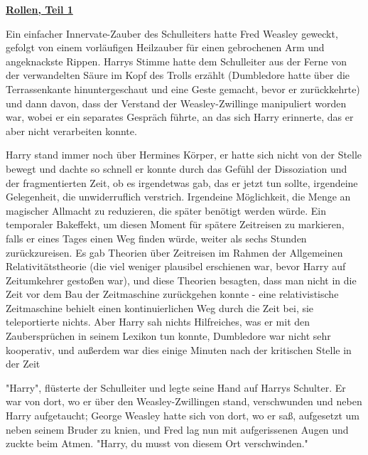 

\hypertarget{rollen-teil-1}{%

\textbf{\uline{Rollen, Teil 1}}

Ein einfacher Innervate-Zauber des Schulleiters hatte Fred Weasley geweckt, gefolgt von einem vorläufigen Heilzauber für einen gebrochenen Arm und angeknackste Rippen. Harrys Stimme hatte dem Schulleiter aus der Ferne von der verwandelten Säure im Kopf des Trolls erzählt (Dumbledore hatte über die Terrassenkante hinuntergeschaut und eine Geste gemacht, bevor er zurückkehrte) und dann davon, dass der Verstand der Weasley-Zwillinge manipuliert worden war, wobei er ein separates Gespräch führte, an das sich Harry erinnerte, das er aber nicht verarbeiten konnte.

Harry stand immer noch über Hermines Körper, er hatte sich nicht von der Stelle bewegt und dachte so schnell er konnte durch das Gefühl der Dissoziation und der fragmentierten Zeit, ob es irgendetwas gab, das er jetzt tun sollte, irgendeine Gelegenheit, die unwiderruflich verstrich. Irgendeine Möglichkeit, die Menge an magischer Allmacht zu reduzieren, die später benötigt werden würde. Ein temporaler Bakeffekt, um diesen Moment für spätere Zeitreisen zu markieren, falls er eines Tages einen Weg finden würde, weiter als sechs Stunden zurückzureisen. Es gab Theorien über Zeitreisen im Rahmen der Allgemeinen Relativitätstheorie (die viel weniger plausibel erschienen war, bevor Harry auf Zeitumkehrer gestoßen war), und diese Theorien besagten, dass man nicht in die Zeit vor dem Bau der Zeitmaschine zurückgehen konnte - eine relativistische Zeitmaschine behielt einen kontinuierlichen Weg durch die Zeit bei, sie teleportierte nichts. Aber Harry sah nichts Hilfreiches, was er mit den Zaubersprüchen in seinem Lexikon tun konnte, Dumbledore war nicht sehr kooperativ, und außerdem war dies einige Minuten nach der kritischen Stelle in der Zeit

"Harry", flüsterte der Schulleiter und legte seine Hand auf Harrys Schulter. Er war von dort, wo er über den Weasley-Zwillingen stand, verschwunden und neben Harry aufgetaucht; George Weasley hatte sich von dort, wo er saß, aufgesetzt um neben seinem Bruder zu knien, und Fred lag nun mit aufgerissenen Augen und zuckte beim Atmen. "Harry, du musst von diesem Ort verschwinden."

}
